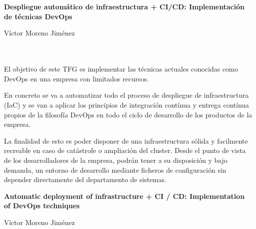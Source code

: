 \chapter*{}





\cleardoublepage
\thispagestyle{empty}

\begin{center}
{\large\bfseries  Despliegue automático de infraestructura + CI/CD: Implementación de técnicas DevOps}\\
\end{center}
\begin{center}
Víctor Moreno Jiménez\\
\end{center}

\\

\vspace{0.7cm}
\\

El objetivo de este TFG es implementar las técnicas actuales conocidas como DevOps en una empresa con limitados recursos. \bigskip

En concreto se va a automatizar todo el proceso de despliegue de infraestructura (IaC) y se van a aplicar los principios de integración contínua y entrega contínua propios de la filosofía DevOps en todo el ciclo de desarrollo de los productos de la empresa. \bigskip

La finalidad de esto es poder disponer de una infraestructura sólida y facilmente recreable en caso de catástrofe o ampliación del cluster. Desde el punto de vista de los desarrolladores de la empresa, podrán tener a su disposición y bajo demanda, un entorno de desarrollo mediante ficheros de configuración sin depender directamente del departamento de sistemas. \bigskip

\cleardoublepage


\thispagestyle{empty}


\begin{center}
{\large\bfseries Automatic deployment of infrastructure + CI / CD: Implementation of DevOps techniques}\\
\end{center}
\begin{center}
Víctor Moreno Jiménez\\
\end{center}

